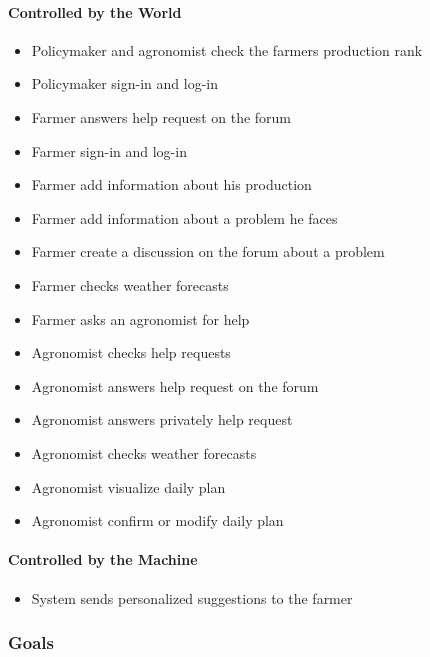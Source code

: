\paragraph{Controlled by the World}
\begin{itemize}
    \item Policymaker and agronomist check the farmers production rank
    \item Policymaker sign-in and log-in
    \item Farmer answers help request on the forum
    \item Farmer sign-in and log-in 
    \item Farmer add information about his production
    \item Farmer add information about a problem he faces
    \item Farmer create a discussion on the forum about a problem
    \item Farmer checks weather forecasts
    \item Farmer asks an agronomist for help
    \item Agronomist checks help requests
    \item Agronomist answers help request on the forum
    \item Agronomist answers privately help request
    \item Agronomist checks weather forecasts
    \item Agronomist visualize daily plan
    \item Agronomist confirm or modify daily plan
\end{itemize}

\paragraph{Controlled by the Machine}
\begin{itemize}
    \item System sends personalized suggestions to the farmer
\end{itemize}

\subsubsection{Goals}

